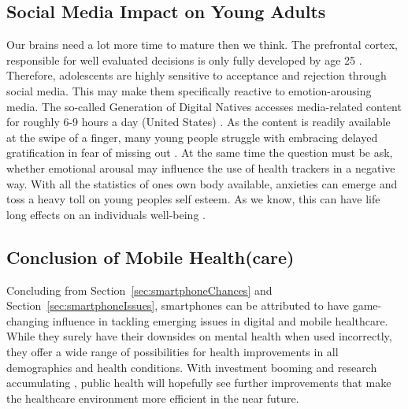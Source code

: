 \subsection{Social Media Impact on Young Adults}
Our brains need a lot more time to mature then we think. The prefrontal cortex, responsible for well evaluated decisions is only fully developed by age 25 \cite{prefrontalCortexDev}. Therefore, adolescents are highly sensitive to acceptance and rejection through social media. This may make them specifically reactive to emotion-arousing media. The so-called Generation of Digital Natives accesses media-related content for roughly 6-9 hours a day (United States) \cite{crone2018media}. As the content is readily available at the swipe of a finger, many young people struggle with embracing delayed gratification in fear of missing out \cite{oberst2017negative}. At the same time the question must be ask, whether emotional arousal may influence the use of health trackers in a negative way. With all the statistics of ones own body available, anxieties can emerge and toss a heavy toll on young peoples self esteem. As we know, this can have life long effects on an individuals well-being \cite{mykletun2006mortality}.
\subsection{Conclusion of Mobile Health(care)}
Concluding from Section~\ref{sec:smartphoneChances} and Section~\ref{sec:smartphoneIssues}, smartphones can be attributed to have game-changing influence in tackling emerging issues in digital and mobile healthcare. While they surely have their downsides on mental health when used incorrectly, they offer a wide range of possibilities for health improvements in all demographics and health conditions. With investment booming \cite{safavi2019top} and research accumulating \cite{firth2016ecological}, public health will hopefully see further improvements that make the healthcare environment more efficient in the near future.
